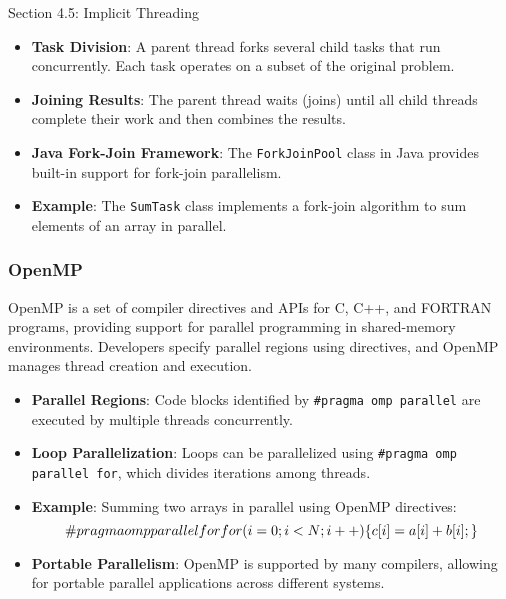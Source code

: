 \begin{notes}{Section 4.5: Implicit Threading}
    \begin{highlight}
    
        \begin{itemize}
            \item \textbf{Task Division}: A parent thread forks several child tasks that run concurrently. Each task operates on a subset of the original problem.
            \item \textbf{Joining Results}: The parent thread waits (joins) until all child threads complete their work and then combines the results.
            \item \textbf{Java Fork-Join Framework}: The \texttt{ForkJoinPool} class in Java provides built-in support for fork-join parallelism.
            \item \textbf{Example}: The \texttt{SumTask} class implements a fork-join algorithm to sum elements of an array in parallel.
        \end{itemize}
    
    \end{highlight}
    
    \subsubsection*{OpenMP}
    
    OpenMP is a set of compiler directives and APIs for C, C++, and FORTRAN programs, providing support for parallel programming in shared-memory environments. Developers specify parallel regions using 
    directives, and OpenMP manages thread creation and execution.
    
    \begin{highlight}[OpenMP]
    
        \begin{itemize}
            \item \textbf{Parallel Regions}: Code blocks identified by \texttt{\#pragma omp parallel} are executed by multiple threads concurrently.
            \item \textbf{Loop Parallelization}: Loops can be parallelized using \texttt{\#pragma omp parallel for}, which divides iterations among threads.
            \item \textbf{Example}: Summing two arrays in parallel using OpenMP directives:
    \[
    \#pragma omp parallel for \\
    for (i = 0; i < N; i++) \{ c[i] = a[i] + b[i]; \}
    \]
            \item \textbf{Portable Parallelism}: OpenMP is supported by many compilers, allowing for portable parallel applications across different systems.
        \end{itemize}
    

\end{highlight}
\end{notes}
